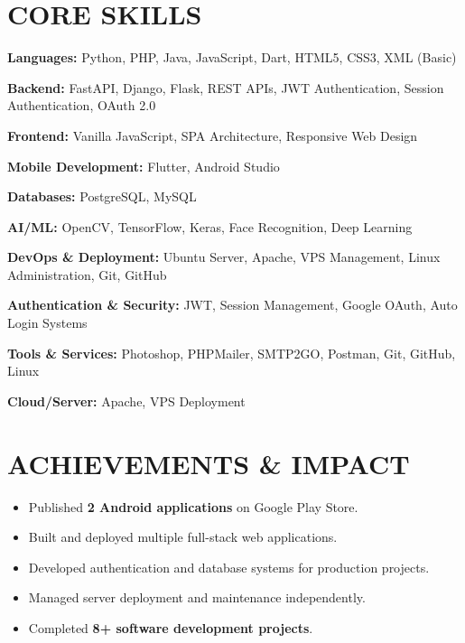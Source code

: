 \documentclass[10pt,a4paper]{article}
\begin{document}

\section*{CORE SKILLS}

\textbf{Languages:} Python, PHP, Java, JavaScript, Dart, HTML5, CSS3, XML (Basic)

\textbf{Backend:} FastAPI, Django, Flask, REST APIs, JWT Authentication, Session Authentication, OAuth 2.0

\textbf{Frontend:} Vanilla JavaScript, SPA Architecture, Responsive Web Design

\textbf{Mobile Development:} Flutter, Android Studio

\textbf{Databases:} PostgreSQL, MySQL

\textbf{AI/ML:} OpenCV, TensorFlow, Keras, Face Recognition, Deep Learning

\textbf{DevOps \& Deployment:} Ubuntu Server, Apache, VPS Management, Linux Administration, Git, GitHub

\textbf{Authentication \& Security:} JWT, Session Management, Google OAuth, Auto Login Systems

\textbf{Tools \& Services:} Photoshop, PHPMailer, SMTP2GO, Postman, Git, GitHub, Linux

\textbf{Cloud/Server:} Apache, VPS Deployment


\section*{ACHIEVEMENTS \& IMPACT}

\begin{itemize}[leftmargin=*,itemsep=0pt,topsep=0pt,parsep=0pt]
\item Published \textbf{2 Android applications} on Google Play Store.
\item Built and deployed multiple full-stack web applications.
\item Developed authentication and database systems for production projects.
\item Managed server deployment and maintenance independently.
\item Completed \textbf{8+ software development projects}.
\end{itemize}


\end{document}
